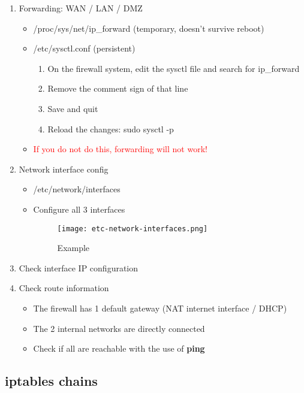 \documentclass{article}
\begin{document}
\begin{enumerate}
    \item Forwarding: WAN / LAN / DMZ
    \begin{itemize}
        \item /proc/sys/net/ip\_forward (temporary, doesn't survive reboot)
        \item /etc/sysctl.conf (persistent)
        \begin{enumerate}
            \item On the firewall system, edit the sysctl file and search for ip\_forward
            \item Remove the comment sign of that line
            \item Save and quit
            \item Reload the changes: sudo sysctl -p 
        \end{enumerate}
        \item \textcolor{red}{If you do not do this, forwarding will not work!}
    \end{itemize}
    \item Network interface config
    \begin{itemize}
        \item /etc/network/interfaces
        \item Configure all 3 interfaces
        \begin{figure}[H]
            \centering
            \texttt{[image: etc-network-interfaces.png]}
            \caption{Example}
        \end{figure}
    \end{itemize}
    \item Check interface IP configuration
    \item Check route information
    \begin{itemize}
        \item The firewall has 1 default gateway (NAT internet interface / DHCP)
        \item The 2 internal networks are directly connected
        \item Check if all are reachable with the use of \textbf{ping}
    \end{itemize}
\end{enumerate}

\subsection{iptables chains}
\end{document}
